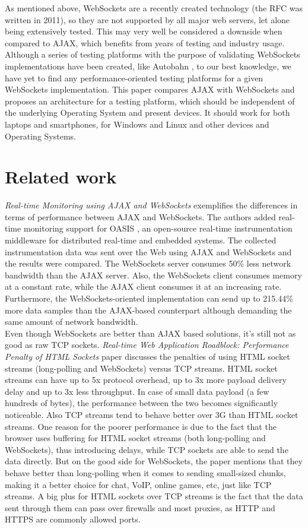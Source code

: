 \documentclass[conference]{IEEEtran}
\begin{document}
As mentioned above, WebSockets are a recently created technology 
(the RFC was written in 2011), so they are not supported by all major
web servers, let alone being extensively tested. This may
very well be considered a downside when compared to AJAX, which benefits from
years of testing and industry usage. Although a series of testing platforms
with the purpose of validating WebSockets implementations have been created,
like Autobahn \cite{Autobahn}, to our best knowledge, we have yet to find any
performance-oriented testing platforms for a given WebSockets implementation.
This paper compares AJAX with WebSockets and proposes an architecture for
a testing platform, which should be independent of the underlying Operating
System and present devices. It should work for both laptops and smartphones,
for Windows and Linux and other devices and Operating Systems.
\vfill\eject

\section{Related work}
\textit{Real-time Monitoring using AJAX and WebSockets} \cite{RT-Monitoring}
exemplifies the differences in terms of performance between AJAX and WebSockets.
The authors added real-time monitoring support for OASIS \cite{OASIS},
an open-source real-time instrumentation middleware for distributed real-time
and embedded systems. The collected instrumentation data was sent over the Web
using AJAX and WebSockets and the results were compared. The WebSockets server
consumes 50\% less network bandwidth than the AJAX server. Also, the WebSockets
client consumes memory at a constant rate, while the AJAX client consumes it
at an increasing rate. Furthermore, the WebSockets-oriented implementation can
send up to 215.44\% more data samples than the AJAX-based counterpart although
demanding the same amount of network bandwidth.
\\

Even though WebSockets are better than AJAX based solutions, it's still not as
good as raw TCP sockets. \textit{Real-time Web Application Roadblock:
Performance Penalty of HTML Sockets} paper \cite{Performance-Penalty} discusses
the penalties of using HTML socket streams (long-polling and WebSockets)
versus TCP streams. HTML socket streams can have up to 5x protocol overhead, up to
3x more payload delivery delay and up to 3x less throughput. In case of small
data payload (a few hundreds of bytes), the performance between the two becomes
significantly noticeable. Also TCP streams tend to behave better over 3G than
HTML socket streams.
One reason for the poorer performance is due to the fact that the browser uses
buffering for HTML socket streams (both long-polling and WebSockets), thus 
introducing delays, while TCP sockets are able to send the data directly.
But on the good side for
WebSockets, the paper mentions that they behave better than long-polling when
it comes to sending small-sized chunks, making it a better choice for chat,
VoIP, online games, etc, just like TCP streams. A big plus for HTML sockets
over TCP streams is the fact that the data sent through them can pass over
firewalls and most proxies, as HTTP and HTTPS are commonly allowed ports.
\\
\end{document}

